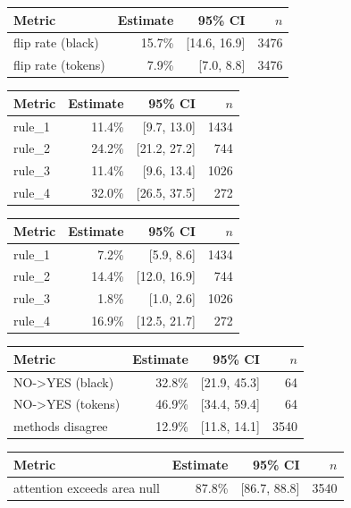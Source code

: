 \begin{tabular}{lrrr}
\toprule
Metric & Estimate & 95\% CI & $n$ \\
\midrule
flip rate (black) & 15.7\% & [14.6, 16.9] & 3476 \\
flip rate (tokens) & 7.9\% & [7.0, 8.8] & 3476 \\
\bottomrule
\end{tabular}

\begin{tabular}{lrrr}
\toprule
Metric & Estimate & 95\% CI & $n$ \\
\midrule
rule\_1 & 11.4\% & [9.7, 13.0] & 1434 \\
rule\_2 & 24.2\% & [21.2, 27.2] & 744 \\
rule\_3 & 11.4\% & [9.6, 13.4] & 1026 \\
rule\_4 & 32.0\% & [26.5, 37.5] & 272 \\
\bottomrule
\end{tabular}

\begin{tabular}{lrrr}
\toprule
Metric & Estimate & 95\% CI & $n$ \\
\midrule
rule\_1 & 7.2\% & [5.9, 8.6] & 1434 \\
rule\_2 & 14.4\% & [12.0, 16.9] & 744 \\
rule\_3 & 1.8\% & [1.0, 2.6] & 1026 \\
rule\_4 & 16.9\% & [12.5, 21.7] & 272 \\
\bottomrule
\end{tabular}

\begin{tabular}{lrrr}
\toprule
Metric & Estimate & 95\% CI & $n$ \\
\midrule
NO->YES (black) & 32.8\% & [21.9, 45.3] & 64 \\
NO->YES (tokens) & 46.9\% & [34.4, 59.4] & 64 \\
methods disagree & 12.9\% & [11.8, 14.1] & 3540 \\
\bottomrule
\end{tabular}

\begin{tabular}{lrrr}
\toprule
Metric & Estimate & 95\% CI & $n$ \\
\midrule
attention exceeds area null & 87.8\% & [86.7, 88.8] & 3540 \\
\bottomrule
\end{tabular}

